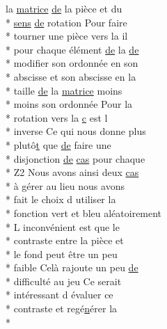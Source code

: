 \begin{DoxyCompactItemize}
la \hyperlink{mainpage_8dox_af2e36bcdda8980a3e5c1f4013331ee45}{matrice} \hyperlink{mainpage_8dox_ab37fa35e77d95c6d0d0ab620c97c3db8}{de} la pièce et du \\*
\hyperlink{mainpage_8dox_aa08a2c237abaf70493855740d9c5d0c8}{sens} \hyperlink{mainpage_8dox_ab37fa35e77d95c6d0d0ab620c97c3db8}{de} rotation Pour faire \\*
tourner une pièce vers la il \\*
pour chaque élément \hyperlink{mainpage_8dox_ab37fa35e77d95c6d0d0ab620c97c3db8}{de} la \hyperlink{mainpage_8dox_ab37fa35e77d95c6d0d0ab620c97c3db8}{de} \\*
modifier son ordonnée en son \\*
abscisse et son abscisse en la \\*
taille \hyperlink{mainpage_8dox_ab37fa35e77d95c6d0d0ab620c97c3db8}{de} la \hyperlink{mainpage_8dox_af2e36bcdda8980a3e5c1f4013331ee45}{matrice} moins \\*
moins son ordonnée Pour la \\*
rotation vers la \hyperlink{glext_8h_a1f2d7f8147412c43ba2303a56f97ee73}{c} est l \\*
inverse Ce qui nous donne plus \\*
plutô\hyperlink{gl_8h_a00140d6f5c548b26daf170bf16e86a6d}{t} que \hyperlink{mainpage_8dox_ab37fa35e77d95c6d0d0ab620c97c3db8}{de} faire une \\*
disjonction \hyperlink{mainpage_8dox_ab37fa35e77d95c6d0d0ab620c97c3db8}{de} \hyperlink{mainpage_8dox_a28d908e91a20ecb016d27b941f85907c}{cas} pour chaque \\*
Z2 Nous avons ainsi deux \hyperlink{mainpage_8dox_a28d908e91a20ecb016d27b941f85907c}{cas} \\*
à \hyperlink{glext_8h_a9cd653b1648845554169fbc3a3f6d37a}{g}érer au lieu nous avons \\*
fait le choix d utiliser la \\*
fonction vert et bleu aléatoirement \\*
L inconvénient est que le \\*
contraste entre la pièce et \\*
le fond peut être un peu \\*
faible Celà rajoute un peu \hyperlink{mainpage_8dox_ab37fa35e77d95c6d0d0ab620c97c3db8}{de} \\*
difficulté au jeu Ce serait \\*
intéressant d évaluer ce \\*
contraste et regé\hyperlink{glext_8h_a0788d3762d0c3c76e4c094d8078b4c27}{n}érer la \\*

\end{DoxyCompactItemize}
